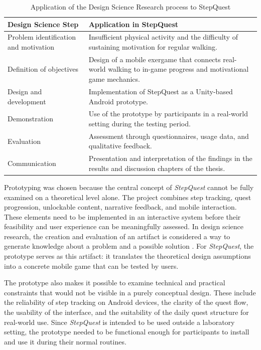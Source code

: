 \begin{table}[h]
	\centering
	\caption{Application of the Design Science Research process to StepQuest}
	\label{tab:dsr_process}
	\begin{tabular}{p{} p{}}
		\hline
		\textbf{Design Science Step} & \textbf{Application in StepQuest} \\
		\hline
		Problem identification and motivation &
		Insufficient physical activity and the difficulty of sustaining motivation for regular walking. \\
		
		Definition of objectives &
		Design of a mobile exergame that connects real-world walking to in-game progress and motivational game mechanics. \\
		
		Design and development &
		Implementation of StepQuest as a Unity-based Android prototype. \\
		
		Demonstration &
		Use of the prototype by participants in a real-world setting during the testing period. \\
		
		Evaluation &
		Assessment through questionnaires, usage data, and qualitative feedback. \\
		
		Communication &
		Presentation and interpretation of the findings in the results and discussion chapters of the thesis. \\
		\hline
	\end{tabular}
\end{table}


Prototyping was chosen because the central concept of \textit{StepQuest} cannot be fully examined on a theoretical level alone. The project combines step tracking, quest progression, unlockable content, narrative feedback, and mobile interaction. These elements need to be implemented in an interactive system before their feasibility and user experience can be meaningfully assessed. In design science research, the creation and evaluation of an artifact is considered a way to generate knowledge about a problem and a possible solution \cite{Hevner2004DesignScience,Peffers2007DSRM}. For \textit{StepQuest}, the prototype serves as this artifact: it translates the theoretical design assumptions into a concrete mobile game that can be tested by users.

The prototype also makes it possible to examine technical and practical constraints that would not be visible in a purely conceptual design. These include the reliability of step tracking on Android devices, the clarity of the quest flow, the usability of the interface, and the suitability of the daily quest structure for real-world use. Since \textit{StepQuest} is intended to be used outside a laboratory setting, the prototype needed to be functional enough for participants to install and use it during their normal routines.

